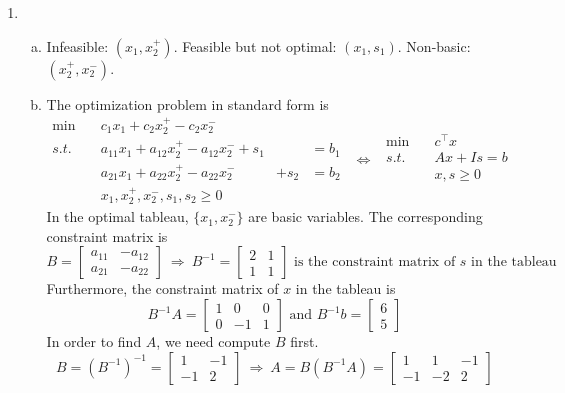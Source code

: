 \begin{enumerate}
	\item 
	\begin{enumerate}[(a)]
		\item Infeasible: $(x_1,x_2^+)$. Feasible but not optimal: $(x_1,s_1)$. Non-basic: $(x_2^+,x_2^-)$.
		\item The optimization problem in standard form is
		\[
		\begin{aligned}
		\min \quad& c_1x_1+c_2x_2^+-c_2x_2^-\\
		s.t. \quad& a_{11}x_1+a_{12}x_{2}^+ - a_{12}x_{2}^- +s_1& &= b_1\\
		&a_{21}x_1+a_{22}x_{2}^+ - a_{22}x_{2}^- &+s_2 &= b_2\\
		&x_1, x_{2}^+,x_2^-,s_1,s_2\ge 0
		\end{aligned}~~\Leftrightarrow~~ 
		\begin{aligned}
		\min \quad& c^\top x\\
		s.t. \quad& Ax + Is=b\\
		&x, s\ge 0\\&~
		\end{aligned}
		\]
		In the optimal tableau, $\{x_1,x_2^-\}$ are basic variables. The corresponding constraint matrix is
		\[
		B = \begin{bmatrix}
		a_{11} & -a_{12}\\a_{21} & -a_{22}
		\end{bmatrix}~\Rightarrow~ B^{-1} = \begin{bmatrix}
		2 & 1\\1 & 1
		\end{bmatrix} \text{ is the constraint matrix of }s \text{ in the tableau} 
		\]
		Furthermore, the constraint matrix of $x$ in the tableau is
		\[
		B^{-1} A = \begin{bmatrix}
		1 & 0 & 0\\0 &-1 &1
		\end{bmatrix} \text{ and } B^{-1}b = \begin{bmatrix}
		6\\5
		\end{bmatrix}
		\]
		In order to find $A$, we need compute $B$ first.
		\[
		B = \left(B^{-1}\right)^{-1} = \begin{bmatrix}
		1 & -1\\ -1 & 2
		\end{bmatrix}~\Rightarrow~ A = B(B^{-1}A) = \begin{bmatrix}
		1 & 1 & -1\\-1 & -2 & 2

\end{bmatrix}\]
\end{enumerate}
\end{enumerate}
